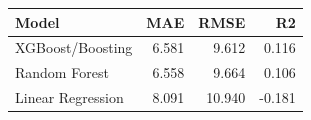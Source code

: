 \begin{tabular}{lrrr}
\toprule
Model & MAE & RMSE & R2 \\
\midrule
XGBoost/Boosting & 6.581 & 9.612 & 0.116 \\
Random Forest & 6.558 & 9.664 & 0.106 \\
Linear Regression & 8.091 & 10.940 & -0.181 \\
\bottomrule
\end{tabular}
